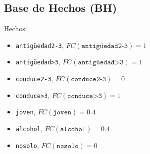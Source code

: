 \subsection{Base de Hechos (BH)}
Hechos:
\begin{itemize}
    \item \texttt{antigüedad2-3}, $FC(\texttt{antigüedad2-3}) = 1$
    \item \texttt{antigüedad>3}, $FC(\texttt{antigüedad>3}) = 1$
    \item \texttt{conduce2-3}, $FC(\texttt{conduce2-3}) = 0$
    \item \texttt{conduce>3}, $FC(\texttt{conduce>3}) = 1$
    \item \texttt{joven}, $FC(\texttt{joven}) = 0.4$
    \item \texttt{alcohol}, $FC(\texttt{alcohol}) = 0.4$
    \item \texttt{nosolo}, $FC(\texttt{nosolo}) = 0$
\end{itemize}
\newpage
